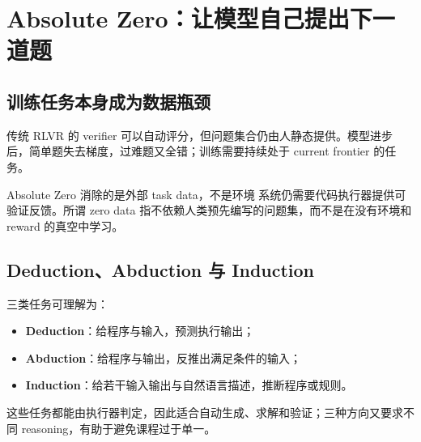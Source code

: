 \section{Absolute Zero：让模型自己提出下一道题}

\subsection{训练任务本身成为数据瓶颈}


传统 RLVR 的 verifier 可以自动评分，但问题集合仍由人静态提供。模型进步后，简单题失去梯度，过难题又全错；训练需要持续处于 current frontier 的任务。



\begin{importantbox}{Absolute Zero 消除的是外部 task data，不是环境}
系统仍需要代码执行器提供可验证反馈。所谓 zero data 指不依赖人类预先编写的问题集，而不是在没有环境和 reward 的真空中学习。
\end{importantbox}

\subsection{Deduction、Abduction 与 Induction}


三类任务可理解为：

\begin{itemize}
    \item \textbf{Deduction}：给程序与输入，预测执行输出；
    \item \textbf{Abduction}：给程序与输出，反推出满足条件的输入；
    \item \textbf{Induction}：给若干输入输出与自然语言描述，推断程序或规则。
\end{itemize}

这些任务都能由执行器判定，因此适合自动生成、求解和验证；三种方向又要求不同 reasoning，有助于避免课程过于单一。

